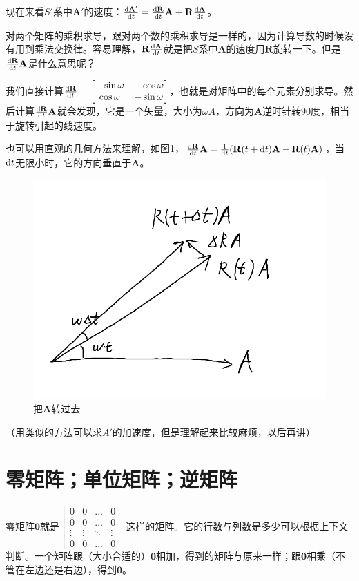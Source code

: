 现在来看$S'$系中$\mathbf{A'}$的速度：$\frac{\mathop{}\!\mathrm{d} \mathbf{A'}}{\mathop{}\!\mathrm{d} t}=\frac{\mathop{}\!\mathrm{d} \mathbf{R}}{\mathop{}\!\mathrm{d} t} \mathbf{A}+\mathbf{R} \frac{\mathop{}\!\mathrm{d} \mathbf{A}}{\mathop{}\!\mathrm{d} t}$。

对两个矩阵的乘积求导，跟对两个数的乘积求导是一样的，因为计算导数的时候没有用到乘法交换律。容易理解，$\mathbf{R} \frac{\mathop{}\!\mathrm{d} \mathbf{A}}{\mathop{}\!\mathrm{d} t}$就是把$S$系中$\mathbf{A}$的速度用$\mathbf{R}$旋转一下。但是$\frac{\mathop{}\!\mathrm{d} \mathbf{R}}{\mathop{}\!\mathrm{d} t} \mathbf{A}$是什么意思呢？

我们直接计算$\frac{\mathop{}\!\mathrm{d} \mathbf{R}}{\mathop{}\!\mathrm{d} t}=\begin{bmatrix}
-\sin \omega & -\cos \omega \\
\cos \omega & -\sin \omega
\end{bmatrix}$，也就是对矩阵中的每个元素分别求导。然后计算$\frac{\mathop{}\!\mathrm{d} \mathbf{R}}{\mathop{}\!\mathrm{d} t} \mathbf{A}$就会发现，它是一个矢量，大小为$\omega A$，方向为$\mathbf{A}$逆时针转$90$度，相当于旋转引起的线速度。

也可以用直观的几何方法来理解，如图\ref{fig-rotate-deri}，$\frac{\mathop{}\!\mathrm{d} \mathbf{R}}{\mathop{}\!\mathrm{d} t} \mathbf{A}=\frac{1}{\mathop{}\!\mathrm{d} t}(\mathbf{R}(t+\mathop{}\!\mathrm{d} t) \mathbf{A}-\mathbf{R}(t) \mathbf{A})$，当$\mathop{}\!\mathrm{d} t$无限小时，它的方向垂直于$\mathbf{A}$。
\begin{figure}[htb]
\centering
\includegraphics[width=0.33\linewidth]{fig/rotate-deri.png}
\caption{把$\mathbf{A}$转过去}
\label{fig-rotate-deri}
\end{figure}

（用类似的方法可以求$A'$的加速度，但是理解起来比较麻烦，以后再讲）
\section{零矩阵；单位矩阵；逆矩阵}
零矩阵$\mathbf{0}$就是$\begin{bmatrix}
0 & 0 & \dots & 0 \\
0 & 0 & \dots & 0 \\
\vdots & \vdots & \ddots & \vdots \\
0 & 0 & \dots & 0
\end{bmatrix}$这样的矩阵。它的行数与列数是多少可以根据上下文判断。一个矩阵跟（大小合适的）$\mathbf{0}$相加，得到的矩阵与原来一样；跟$\mathbf{0}$相乘（不管在左边还是右边），得到$\mathbf{0}$。


